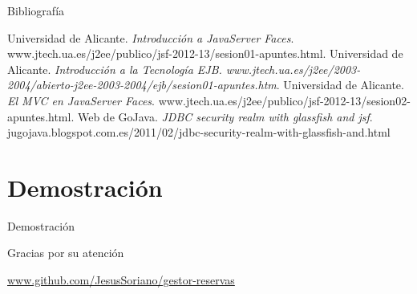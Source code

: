 \documentclass[spanish,xcolor=table,svgnames]{beamer}
\begin{document}
\begin{frame}{Bibliografí­a}
  \begin{thebibliography}{10}
    \beamertemplatebookbibitems
     Universidad de Alicante. \emph{Introducción a JavaServer Faces}. www.jtech.ua.es/j2ee/publico/jsf-2012-13/sesion01-apuntes.html.
     Universidad de Alicante. \emph{Introducción a la Tecnología EJB. www.jtech.ua.es/j2ee/2003-2004/abierto-j2ee-2003-2004/ejb/sesion01-apuntes.htm}.
     Universidad de Alicante. \emph{El MVC en JavaServer Faces}. www.jtech.ua.es/j2ee/publico/jsf-2012-13/sesion02-apuntes.html.
     Web de GoJava. \emph{JDBC security realm with glassfish and jsf}. jugojava.blogspot.com.es/2011/02/jdbc-security-realm-with-glassfish-and.html
  \end{thebibliography} 
\end{frame}




\section{Demostración}
\begin{frame}{Demostración}
  \tableofcontents[currentsection]
\end{frame}





\appendix
\frame
{
  \begin{center}
    \Huge{Gracias por su atención}
  \end{center}
  \begin{center}
    \url{www.github.com/JesusSoriano/gestor-reservas}
  \end{center}
}
\end{document}
